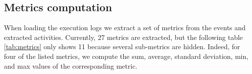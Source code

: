 \subsection{Metrics computation}

When loading the execution logs we extract a set of metrics from the events and extracted activities. Currently, 27 metrics are extracted, but the following table \ref{tab:metrics} only shows 11 because several sub-metrics are hidden. Indeed, for four of the listed metrics, we compute the sum, average, standard deviation, min, and max values of the corresponding metric.


